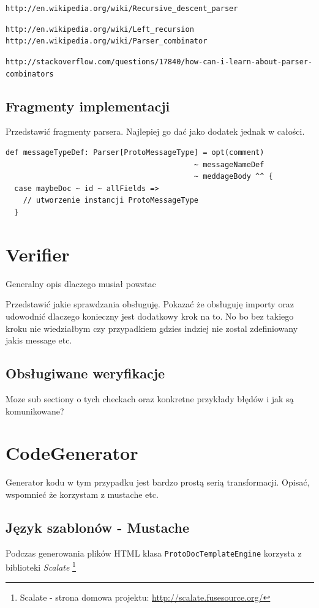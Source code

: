 \documentclass[pdflatex,11pt]{aghdpl}
\begin{document}
\verb|http://en.wikipedia.org/wiki/Recursive_descent_parser|

\verb|http://en.wikipedia.org/wiki/Left_recursion|
\verb|http://en.wikipedia.org/wiki/Parser_combinator|

\verb|http://stackoverflow.com/questions/17840/how-can-i-learn-about-parser-combinators|

\subsection{Fragmenty implementacji}
Przedstawić fragmenty parsera. Najlepiej go dać jako dodatek jednak w całości.

\begin{lstlisting}
def messageTypeDef: Parser[ProtoMessageType] = opt(comment) 
                                           ~ messageNameDef
                                           ~ meddageBody ^^ {
  case maybeDoc ~ id ~ allFields =>
    // utworzenie instancji ProtoMessageType
  }
\end{lstlisting}


\section{Verifier}
Generalny opis dlaczego musiał powstac

Przedstawić jakie sprawdzania obsługuję. 
Pokazać że obsługuję importy oraz udowodnić dlaczego konieczny jest dodatkowy krok na to.
No bo bez takiego kroku nie wiedziałbym czy przypadkiem gdzies indziej nie zostal zdefiniowany jakis message etc.

\subsection{Obsługiwane weryfikacje}
Moze sub sectiony o tych checkach oraz konkretne przykłady błędów i jak są komunikowane?


\section{CodeGenerator}
Generator kodu w tym przypadku jest bardzo prostą serią transformacji.
Opisać, wspomnieć że korzystam z mustache etc.

\subsection{Język szablonów - Mustache}
\label{sec:mustache}
Podczas generowania plików HTML klasa \verb|ProtoDocTemplateEngine| korzysta z biblioteki \textit{Scalate} \footnote{Scalate - strona domowa 
projektu: \href{http://scalate.fusesource.org/}{http://scalate.fusesource.org/}}
\end{document}
